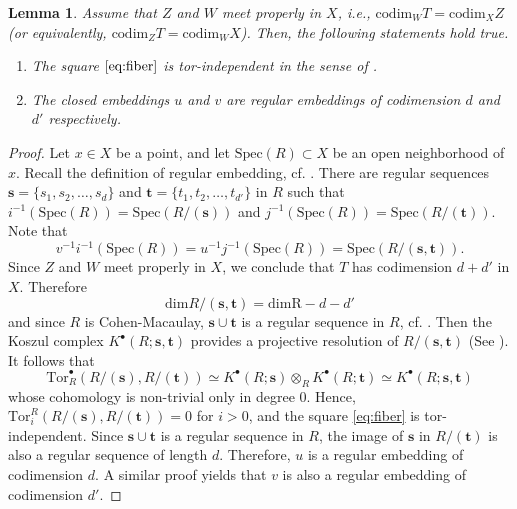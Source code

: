 \documentclass[a4paper]{amsart}
\theoremstyle{plain}
\newtheorem{lemma}[theorem]{Lemma}
\theoremstyle{definition}
\numberwithin{equation}{section}
\begin{document}
\begin{lemma}\label{lma:meet-proper-tor-independent}
    Assume that $Z$ and $W$ meet properly in $X$, i.e., $\mathrm{codim}_W T = \mathrm{codim}_X Z $ (or equivalently, $ \mathrm{codim}_Z T = \mathrm{codim}_W X$). Then, the following statements hold true.
    \begin{enumerate}
        \item The square $\eqref{eq:fiber}$ is tor-independent in the sense of \cite[Definition 3.10.2]{lipman2009notes}.
        \item The closed embeddings $u$ and $v$ are regular embeddings of codimension $d$ and $d'$ respectively.
    \end{enumerate}
\end{lemma}
\begin{proof}
    Let $x\in X$ be a point, and let $\mathrm{Spec}(R) \subset X$ be an open neighborhood of $x$. Recall the definition of regular embedding, cf. \cite[Appendix B.7.1]{fulton1998intersection}. There are regular sequences $\mathbf{s} = \{s_1, s_2 ,\ldots , s_{d}\}$ and $\mathbf{t} = \{t_1, t_2 ,\ldots , t_{d'}\}$ in $R$ such that $i^{-1}(\mathrm{Spec}(R)) = \mathrm{Spec}(R/(\mathbf{s}))$ and $j^{-1}(\mathrm{Spec}(R)) = \mathrm{Spec}(R/(\mathbf{t}))$. Note that
    \[
        v^{-1} i^{-1}(\mathrm{Spec}(R)) = u^{-1} j^{-1}(\mathrm{Spec}(R)) = \mathrm{Spec}(R/(\mathbf{s}, \mathbf{t})).
    \]
    Since $Z$ and $W$ meet properly in $X$, we conclude that $T$ has codimension $d+d'$ in $X$. Therefore
    \[
        \mathrm{dim} R/(\mathbf{s}, \mathbf{t}) = \mathrm{dim}\mathrm{R} - d - d'
    \]
    and since $R$ is Cohen-Macaulay, $\mathbf{s} \cup \mathbf{t}$ is a regular sequence in $R$, cf. \cite[Theorem 2.1.2(c)]{bruns1993cohen}. Then the Koszul complex $K^{\bullet}(R;\mathbf{s}, \mathbf{t}) $ provides a projective resolution of $  R/(\mathbf{s}, \mathbf{t})$ (See \cite[Corollary 1.6.14(b)]{bruns1993cohen}). It follows  that
    \[
        \mathrm{Tor}^{\bullet}_{R}(R/(\mathbf{s}), R/(\mathbf{t})) \simeq K^{\bullet}(R;\mathbf{s}) \otimes_{R} K^{\bullet}(R;\mathbf{t}) \simeq K^{\bullet}(R;\mathbf{s}, \mathbf{t})
    \]
    whose cohomology is non-trivial only in  degree $0$. Hence, $\mathrm{Tor}_i^R(R/(\mathbf{s}), R/(\mathbf{t}))=0$ for $i > 0$, and the square \eqref{eq:fiber} is tor-independent. Since  $\mathbf{s} \cup \mathbf{t}$ is a regular sequence in $R$,  the image of $\mathbf{s}$ in $R/(\mathbf{t})$ is also a regular sequence of length $d$. Therefore, $u$ is a regular embedding of codimension $d$. A similar proof yields that $v$ is also a regular embedding of codimension $d'$.
\end{proof}
\end{document}
